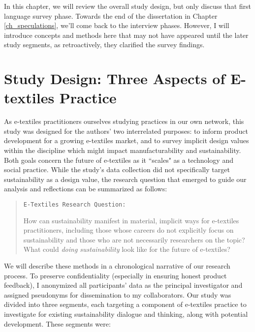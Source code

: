 In this chapter, we will review the overall study design, but only discuss that first language survey phase. Towards the end of the dissertation in Chapter \ref{ch_speculations}, we'll come back to the interview phases. However, I will introduce concepts and methods here that may not have appeared until the later study segments, as retroactively, they clarified the survey findings.

\section{Study Design: Three Aspects of E-textiles Practice}

As e-textiles practitioners ourselves studying practices in our own network, this study was designed for the authors' two interrelated purposes: to inform product development for a growing e-textiles market, and to survey implicit design values within the discipline which might impact manufacturability and sustainability. Both goals concern the future of e-textiles as it ``scales" as a technology and social practice. While the study's data collection did not specifically target sustainability as a design value, the research question that emerged to guide our analysis and reflections can be summarized as follows:

\begin{quote}

\texttt{E-Textiles Research Question:}

How can sustainability manifest in material, implicit ways for e-textiles practitioners, including those whose careers do not explicitly focus on sustainability and those who are not necessarily researchers on the topic? What could \textit{doing sustainability} look like for the future of e-textiles?
\end{quote}  

We will describe these methods in a chronological narrative of our research process. To preserve confidentiality (especially in ensuring honest product feedback), I anonymized all participants' data as the principal investigator and assigned pseudonyms for dissemination to my collaborators.
Our study was divided into three segments, each targeting a component of e-textiles practice to investigate for existing sustainability dialogue and thinking, along with potential development. These segments were:

